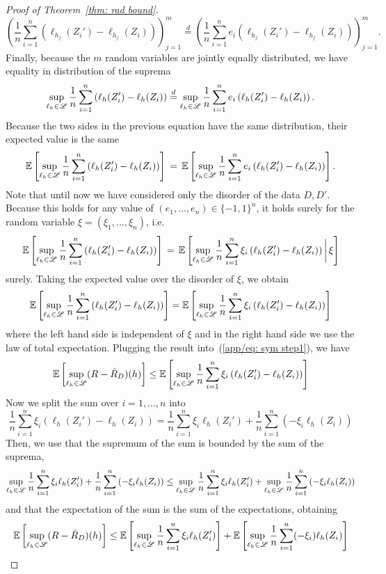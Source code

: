 \documentclass[reqno]{amsart}
\begin{document}
\begin{theorem}
\begin{proof}[Proof of Theorem~\ref{thm: rad bound}]
\[
\left(\frac1n\sum_{i=1}^n \left(\ell_{h_j}(Z_i')-\ell_{h_j}(Z_i)\right)\right)_{j=1}^m \overset{d}{=} \left(\frac1n\sum_{i=1}^n e_i\left(\ell_{h_j}(Z_i')-\ell_{h_j}(Z_i)\right)\right)_{j=1}^m.
\]
Finally, because the $m$ random variables are jointly equally distributed, we have equality in distribution of the suprema
\[
\sup_{\ell_h\in\mathscr{L}}\frac1n\sum_{i=1}^n \left(\ell_h(Z_i')-\ell_h(Z_i)\right) \overset{d}{=} \sup_{\ell_h\in\mathscr{L}}\frac1n\sum_{i=1}^n e_i\left(\ell_h(Z_i')-\ell_h(Z_i)\right).
\]
Because the two sides in the previous equation have the same distribution, their expected value is the same
\[
\mathbb{E}\left[\sup_{\ell_h\in\mathscr{L}}\frac1n\sum_{i=1}^n \left(\ell_h(Z_i')-\ell_h(Z_i)\right)\right]\, = \,\mathbb{E}\left[\sup_{\ell_h\in\mathscr{L}}\frac1n\sum_{i=1}^n e_i\left(\ell_h(Z_i')-\ell_h(Z_i)\right)\right].
\]
Note that until now we have considered only the disorder of the data $D,D'$. Because this holds for any value of $(e_1,\ldots,e_n)\in\{-1,1\}^n$, it holds surely for the random variable $\xi = (\xi_1,\ldots,\xi_n)$, i.e.\ 
\[
\mathbb{E}\left[\sup_{\ell_h\in\mathscr{L}}\frac1n\sum_{i=1}^n \left(\ell_h(Z_i')-\ell_h(Z_i)\right)\right]\, = \,\mathbb{E}\left[\sup_{\ell_h\in\mathscr{L}}\frac1n\sum_{i=1}^n \xi_i\left(\ell_h(Z_i')-\ell_h(Z_i)\right)\bigg\vert\, \xi\right]
\]
surely. Taking the expected value over the disorder of $\xi$, we obtain
\[
\mathbb{E}\left[\sup_{\ell_h\in\mathscr{L}}\frac1n\sum_{i=1}^n \left(\ell_h(Z_i')-\ell_h(Z_i)\right)\right] = \mathbb{E}\left[\sup_{\ell_h\in\mathscr{L}}\frac1n\sum_{i=1}^n \xi_i\left(\ell_h(Z_i')-\ell_h(Z_i)\right)\right]
\]
where the left hand side is independent of $\xi$ and in the right hand side we use the law of total expectation. 
Plugging the result into~(\ref{app/eq: sym step1}), we have 
\[
\mathbb{E}\left[\sup_{\ell_h\in\mathscr{L}}(R-\hat R_D)(h)\right] \le\mathbb{E}\left[\sup_{\ell_h\in\mathscr{L}}\frac1n\sum_{i=1}^n \xi_i\left(\ell_h(Z_i')-\ell_h(Z_i)\right)\right]
\]
Now we split the sum over $i=1,\ldots,n$ into
\[
\frac1n\sum_{i=1}^n \xi_i\left(\ell_h(Z_i')-\ell_h(Z_i)\right) = \frac1n\sum_{i=1}^n \xi_i\ell_h(Z_i') + \frac1n\sum_{i=1}^n\left(-\xi_i\ell_h(Z_i)\right)
\]
Then, we use that the supremum of the sum is bounded by the sum of the suprema, 
\[
\sup_{\ell_h\in\mathscr{L}} \frac1n\sum_{i=1}^n \xi_i\ell_h(Z_i') + \frac1n\sum_{i=1}^n\left(-\xi_i\ell_h(Z_i)\right) \le \sup_{\ell_h\in\mathscr{L}} \frac1n\sum_{i=1}^n \xi_i\ell_h(Z_i') + \sup_{\ell_h\in\mathscr{L}}\frac1n\sum_{i=1}^n\left(-\xi_i\ell_h(Z_i)\right)
\]
and that the expectation of the sum is the sum of the expectations, obtaining
\[
\mathbb{E}\left[\sup_{\ell_h\in\mathscr{L}}(R-\hat R_D)(h)\right] \le\mathbb{E}\left[\sup_{\ell_h\in\mathscr{L}}\frac1n\sum_{i=1}^n \xi_i\ell_h(Z_i')\right] + \mathbb{E}\left[\sup_{\ell_h\in\mathscr{L}}\frac1n\sum_{i=1}^n (-\xi_i)\ell_h(Z_i)\right]
\]
\end{proof}
\end{theorem}
\end{document}
